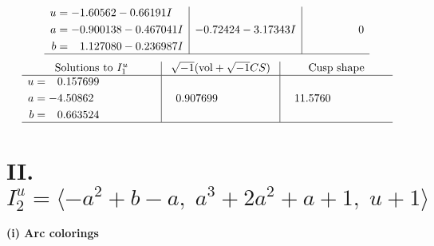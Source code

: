 \documentclass[1p]{elsarticle_modified}
\theoremstyle{definition}
\newcommand{\I}{\sqrt{-1}}
\begin{document}
$$\begin{array}{c|c|c}
\begin{aligned}
u &= -1.60562 - 0.66191 I \\
a &= -0.900138 - 0.467041 I \\
b &= \phantom{-}1.127080 - 0.236987 I\end{aligned}
 & -0.72424 - 3.17343 I & \phantom{-0.000000 } 0\\
 \hline 
 \end{array}$$\newpage$$\begin{array}{c|c|c}  
\text{Solutions to }I^u_{1}& \I (\text{vol} + \sqrt{-1}CS) & \text{Cusp shape}\\
 \hline 
\begin{aligned}
u &= \phantom{-}0.157699\phantom{ +0.000000I} \\
a &= -4.50862\phantom{ +0.000000I} \\
b &= \phantom{-}0.663524\phantom{ +0.000000I}\end{aligned}
 & \phantom{-}0.907699\phantom{ +0.000000I} & \phantom{-}11.5760\phantom{ +0.000000I}\\
 \hline 
 \end{array}$$\newpage\newpage\renewcommand{\arraystretch}{1}
\centering \section*{II. $I^u_{2}= \langle - a^2+b- a,\;a^3+2 a^2+a+1,\;u+1 \rangle$}
\flushleft \textbf{(i) Arc colorings}\\
\end{document}
